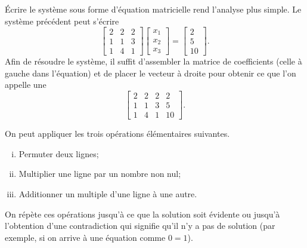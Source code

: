 Écrire le système sous forme d’équation matricielle rend l'analyse plus simple. Le système précédent peut s’écrire
\begin{equation*}
\begin{bmatrix}
2 & 2 & 2 \\
1 & 1 & 3 \\
1 & 4 & 1 
\end{bmatrix}
\begin{bmatrix}
x_1 \\
x_2 \\
x_3
\end{bmatrix} 
=
\begin{bmatrix}
2 \\
5 \\
10
\end{bmatrix} .
\end{equation*}
Afin de résoudre le système, il suffit d’assembler la matrice de coefficients (celle à gauche dans l’équation) et de placer le vecteur à droite pour obtenir ce que l’on appelle une
\emph{}
\begin{equation*}
\left[
\begin{array}{ccc|c}
2 & 2 & 2 & 2 \\
1 & 1 & 3 & 5 \\
1 & 4 & 1 & 10
\end{array}
\right] .
\end{equation*}

\pagebreak[2]
On peut appliquer les trois opérations élémentaires suivantes.
\begin{enumerate}[(i)]
\item Permuter deux lignes;
\item Multiplier une ligne par un nombre non nul;
\item Additionner un multiple d’une ligne à une autre.
\end{enumerate}
On répète ces opérations jusqu'à ce que la solution soit évidente ou jusqu’à l’obtention d’une contradiction qui signifie qu’il n’y a pas de solution (par exemple, si on arrive à une équation comme $0=1$).

